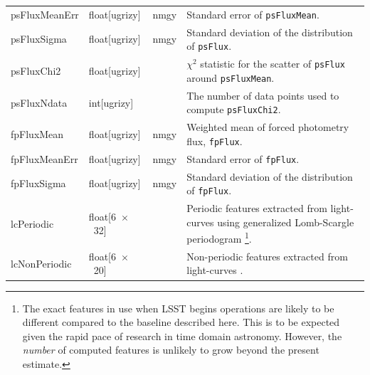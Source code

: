\documentclass[12pt]{article}
\newcommand\x         {\hbox{$\times$}}
\begin{document}
\begin{center}
\begin{longtable}{p{3cm}p{2cm}p{2cm}p{5cm}}
psFluxMeanErr & float[ugrizy] & nmgy & Standard error of {\tt psFluxMean}.  \\

psFluxSigma & float[ugrizy] & nmgy & Standard deviation of the distribution of {\tt psFlux}. \\

psFluxChi2 & float[ugrizy] & ~ & $\chi^2$ statistic for the scatter of {\tt psFlux} around {\tt psFluxMean}. \\

psFluxNdata & int[ugrizy] & ~ & The number of data points used to compute {\tt psFluxChi2}. \\

fpFluxMean & float[ugrizy] & nmgy & Weighted mean of forced photometry flux, {\tt fpFlux}.\\

fpFluxMeanErr & float[ugrizy] & nmgy & Standard error of {\tt fpFlux}. \\

fpFluxSigma & float[ugrizy] & nmgy & Standard deviation of the distribution of {\tt fpFlux}. \\





lcPeriodic & float[6~\x~32] & ~ & Periodic features extracted from light-curves using generalized Lomb-Scargle periodogram \citep[Table~4,][]{2011ApJ...733...10R}\footnote{The exact features in use when LSST begins operations are likely to be different compared to the baseline described here. This is to be expected given the rapid pace of research in time domain astronomy. However, the {\em number} of computed features is unlikely to grow beyond the present estimate.}. \\

lcNonPeriodic & float[6~\x~20] & ~ & Non-periodic features extracted from light-curves \citep[Table~5,][]{2011ApJ...733...10R}. \\


\end{longtable}
\end{center}
\end{document}
